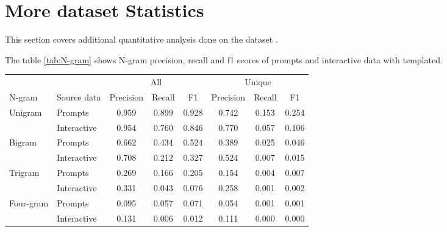 \section{More dataset Statistics}
\label{sec:dataset_appendix_stats}
This section covers additional quantitative analysis done on the dataset .

The table \ref{tab:N-gram} shows N-gram precision, recall and f1 scores of prompts and interactive data with templated.
\begin{table*}
\small
\center
\begin{tabular}{ll|ccc|ccc}
				& 								& \multicolumn{3}{c|}{All} 					& \multicolumn{3}{c}{Unique} \\
N-gram     	&   Source data       				& Precision		& Recall 		& F1 	& Precision		& Recall 		& F1 \\
\midrule
\multirow{2}{*}{Unigram}      & Prompts 	& 0.959    	& 0.899  	& 0.928		& 0.742    	& 0.153    	& 0.254  \\
                                & Interactive    	& 0.954    	& 0.760  	& 0.846		& 0.770    	& 0.057   	& 0.106 \\
\midrule
\multirow{2}{*}{Bigram}        & Prompts   & 0.662   & 0.434   & 0.524   & 0.389   & 0.025   & 0.046   \\
                                & Interactive    	& 0.708   & 0.212   & 0.327   & 0.524   & 0.007   & 0.015    \\ 
\midrule
\multirow{2}{*}{Trigram}	& Prompts 	& 0.269   & 0.166   & 0.205   & 0.154   & 0.004   & 0.007   \\ 
                                & Interactive    	& 0.331   & 0.043   & 0.076   & 0.258   & 0.001   & 0.002   \\ 
\midrule
\multirow{2}{*}{Four-gram}	& Prompts 	& 0.095   & 0.057   & 0.071   & 0.054   & 0.001   & 0.001   \\ 
                                & Interactive    	& 0.131   & 0.006   & 0.012   & 0.111   & 0.000   & 0.000   \\
\end{tabular}
\caption{We show precision, recall and f1 of n-grams of prompts and interactive data with the templated data source. The ``All'' column here refers to all n-grams and ``Unique'' refers to only unique ones. }
\label{tab:N-gram}
\end{table*}